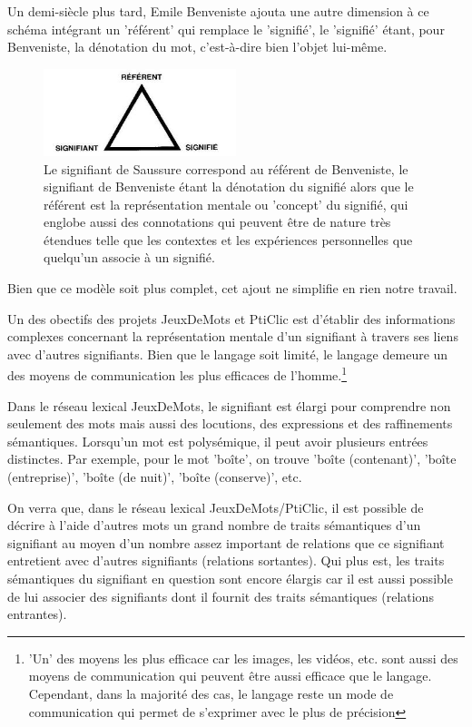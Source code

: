 \documentclass[a4paper,11pt,french]{article}
\begin{document}
Un demi-siècle plus tard, Emile Benveniste ajouta une autre dimension à ce schéma intégrant un 'référent' qui remplace le 'signifié', le 'signifié' étant, pour Benveniste, la dénotation du mot, c'est-à-dire bien l'objet lui-même. 

\begin{figure}[h!]
  \centering
      \includegraphics[width=0.5\textwidth]{img/trianglesemiotique.jpeg}
  \caption{Le signifiant de Saussure correspond au référent de Benveniste, le signifiant de Benveniste étant la dénotation du signifié alors que le référent est la représentation mentale ou 'concept' du signifié, qui englobe aussi des connotations qui peuvent être de nature très étendues telle que les contextes et les expériences personnelles que quelqu'un associe à un signifié.}
\end{figure}

Bien que ce modèle soit plus complet, cet ajout ne simplifie en rien notre travail. 

Un des obectifs des projets JeuxDeMots et PtiClic est d'établir des informations complexes concernant la représentation mentale d'un signifiant à travers ses liens avec d'autres signifiants. Bien que le langage soit limité, le langage demeure un des moyens de communication les plus efficaces de l'homme.\footnote{'Un' des moyens les plus efficace car les images, les vidéos, etc. sont aussi des moyens de communication qui peuvent être aussi efficace que le langage. Cependant, dans la majorité des cas, le langage reste un mode de communication qui permet de s'exprimer avec le plus de précision} 

Dans le réseau lexical JeuxDeMots, le signifiant est élargi pour comprendre non seulement des mots mais aussi des locutions, des expressions et des raffinements sémantiques. Lorsqu'un mot est polysémique, il peut avoir plusieurs entrées distinctes. Par exemple, pour le mot 'boîte', on trouve 'boîte (contenant)', 'boîte (entreprise)', 'boîte (de nuit)', 'boîte (conserve)', etc.

On verra que, dans le réseau lexical JeuxDeMots/PtiClic, il est possible de décrire à l'aide d'autres mots un grand nombre de traits sémantiques d'un signifiant au moyen d'un nombre assez important de relations que ce signifiant entretient avec d'autres signifiants (relations sortantes). Qui plus est, les traits sémantiques du signifiant en question sont encore élargis car il est aussi possible de lui associer des signifiants dont il fournit des traits sémantiques (relations entrantes). 
\end{document}
